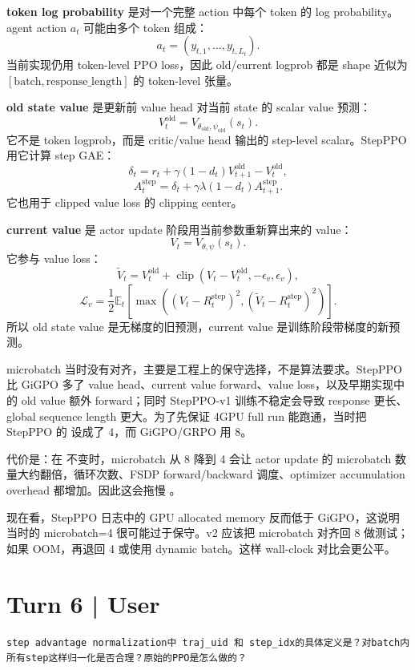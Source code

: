 \documentclass[10pt]{ctexart}
\begin{document}
\textbf{token log probability} 是对一个完整 action 中每个 token 的 log probability。agent action $a_t$ 可能由多个 token 组成：
\[
a_t=(y_{t,1},\ldots,y_{t,L_t}).
\]
当前实现仍用 token-level PPO loss，因此 old/current logprob 都是 shape 近似为 $[\mathrm{batch},\mathrm{response\_length}]$ 的 token-level 张量。

\textbf{old state value} 是更新前 value head 对当前 state 的 scalar value 预测：
\[
V^{\mathrm{old}}_t=V_{\theta_{\mathrm{old}},\psi_{\mathrm{old}}}(s_t).
\]
它不是 token logprob，而是 critic/value head 输出的 step-level scalar。StepPPO 用它计算 step GAE：
\[
\delta_t=r_t+\gamma(1-d_t)V^{\mathrm{old}}_{t+1}-V^{\mathrm{old}}_t,
\]
\[
A_t^{\mathrm{step}}
=
\delta_t+\gamma\lambda(1-d_t)A_{t+1}^{\mathrm{step}}.
\]
它也用于 clipped value loss 的 clipping center。

\textbf{current value} 是 actor update 阶段用当前参数重新算出来的 value：
\[
V_t=V_{\theta,\psi}(s_t).
\]
它参与 value loss：
\[
\widetilde V_t
=
V^{\mathrm{old}}_t+
\operatorname{clip}(V_t-V^{\mathrm{old}}_t,-\epsilon_v,\epsilon_v),
\]
\[
\mathcal L_v
=
\frac12\mathbb E_t\left[
\max\left((V_t-R_t^{\mathrm{step}})^2,
(\widetilde V_t-R_t^{\mathrm{step}})^2\right)
\right].
\]
所以 old state value 是无梯度的旧预测，current value 是训练阶段带梯度的新预测。

microbatch 当时没有对齐，主要是工程上的保守选择，不是算法要求。StepPPO 比 GiGPO 多了 value head、current value forward、value loss，以及早期实现中的 old value 额外 forward；同时 StepPPO-v1 训练不稳定会导致 response 更长、global sequence length 更大。为了先保证 4GPU full run 能跑通，当时把 StepPPO 的  设成了 4，而 GiGPO/GRPO 用 8。

代价是：在  不变时，microbatch 从 8 降到 4 会让 actor update 的 microbatch 数量大约翻倍，循环次数、FSDP forward/backward 调度、optimizer accumulation overhead 都增加。因此这会拖慢 。

现在看，StepPPO 日志中的 GPU allocated memory 反而低于 GiGPO，这说明当时的 microbatch=4 很可能过于保守。v2 应该把 microbatch 对齐回 8 做测试；如果 OOM，再退回 4 或使用 dynamic batch。这样 wall-clock 对比会更公平。


\section*{Turn 6 | User}
\begin{Verbatim}[breaklines=true,breakanywhere=true]
step advantage normalization中 traj_uid 和 step_idx的具体定义是？对batch内所有step这样归一化是否合理？原始的PPO是怎么做的？
\end{Verbatim}
\end{document}
